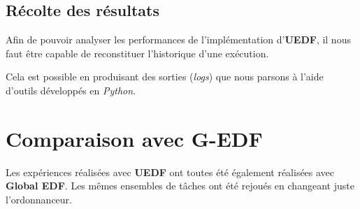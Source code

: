 		
\subsection{Récolte des résultats}
	Afin de pouvoir analyser les performances de l'implémentation d'\textbf{UEDF}, il nous faut être capable de reconstituer 
	l'historique d'une exécution. \newline
	
	Cela est possible en produisant des sorties (\textit{logs}) que nous parsons à l'aide d'outils 
	développés en \textit{Python}. 
	

\section{Comparaison avec G-EDF}

	Les expériences réalisées avec \textbf{UEDF }ont toutes été également réalisées avec \textbf{Global EDF}.
	Les mêmes ensembles de tâches ont été rejoués en changeant juste l'ordonnanceur. 